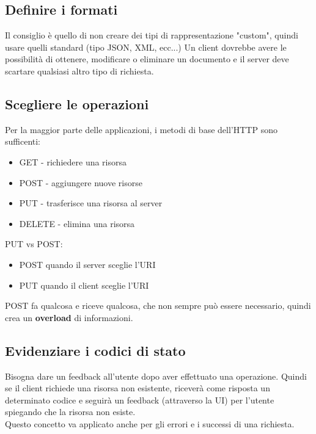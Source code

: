 \documentclass[12pt, a4paper]{article}
\begin{document}
    \subsection*{Definire i formati}
    Il consiglio è quello di non creare dei tipi di rappresentazione "custom", quindi usare quelli standard (tipo JSON, XML, ecc...)
    Un client dovrebbe avere le possibilità di ottenere, modificare o eliminare un documento e il server
    deve scartare qualsiasi altro tipo di richiesta.
    \subsection*{Scegliere le operazioni}
    Per la maggior parte delle applicazioni, i metodi di base dell'HTTP sono sufficenti:
    \begin{itemize}
        \item GET - richiedere una risorsa
        \item POST - aggiungere nuove risorse
        \item PUT - trasferisce una risorsa al server
        \item DELETE - elimina una risorsa
    \end{itemize}
    PUT vs POST: 
    \begin{itemize}
        \item POST quando il server sceglie l'URI
        \item PUT quando il client sceglie l'URI
    \end{itemize}
    POST fa qualcosa e riceve qualcosa, che non sempre può essere necessario, quindi crea un \textbf{overload} di informazioni.
    \subsection*{Evidenziare i codici di stato}
    Bisogna dare un feedback all'utente dopo aver effettuato una operazione. 
    Quindi se il client richiede una risorsa non esistente, riceverà come risposta un determinato codice e seguirà
    un feedback (attraverso la UI) per l'utente spiegando che la risorsa non esiste.
    \\Questo concetto va applicato anche per gli errori e i successi di una richiesta.
\end{document}
